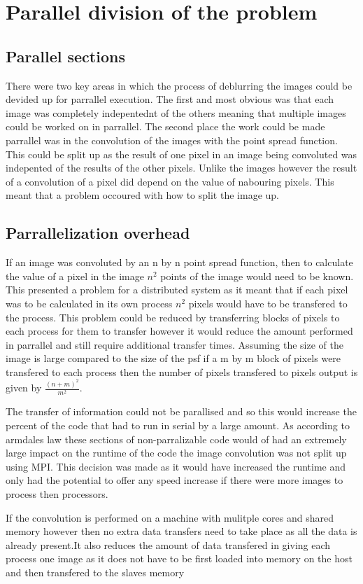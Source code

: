 \section{Parallel division of the problem}

\subsection{Parallel sections}
There were two key areas in which the process of deblurring the images could be devided up for parrallel execution. The first and most obvious was that each image was completely indepentednt of the others meaning that multiple images could be worked on in parrallel. The second place the work could be made parrallel was in the convolution of the images with the point spread function. This could be split up as the result of one pixel in an image being convoluted was indepented of the results of the other pixels. Unlike the images however the result of a convolution of a pixel did depend on the value of nabouring pixels. This meant that a problem occoured with how to split the image up.

\subsection{Parrallelization overhead}
If an image was convoluted by an n by n point spread function, then to calculate the value of a pixel in the image \(n^2\) points of the image would need to be known. This presented a problem for a distributed system as it meant that if each pixel was to be calculated in its own process \(n^2\) pixels would have to be transfered to the process. This problem could be reduced by transferring blocks of pixels to each process for them to transfer however it would reduce the amount performed in parrallel and still require additional transfer times. Assuming the size of the image is large compared to the size of the psf if a m by m block of pixels were transfered to each process then the number of pixels transfered to pixels output is given by \(\frac{(n+m)^2}{m^2}\).

The transfer of information could not be parallised and so this would increase the percent of the code that had to run in serial by a large amount. As according to armdales law these sections of non-parralizable code would of had an extremely large impact on the runtime of the code the image convolution was not split up using MPI. This decision was made as it would have increased the runtime and only had the potential to offer any speed increase if there were more images to process then processors.

If the convolution is performed on a machine with mulitple cores and shared memory however then no extra data transfers need to take place as all the data is already present.It also reduces the amount of data transfered in giving each process one image as it does not have to be first loaded into memory on the host and then transfered to the slaves memory